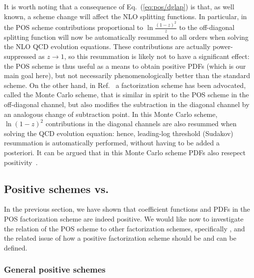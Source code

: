It is worth noting that a consequence of Eq.~(\ref{eq:pos/dglap}) is that,
as well known, a scheme change will affect the NLO splitting
functions. In particular, in the POS scheme contributions proportional
to $\ln\frac{(1-z)^2}{z}$ to the off-diagonal splitting function will
now be automatically resummed to all orders when solving the NLO QCD
evolution equations. These contributions are actually power-suppressed
as $z\to1$, so this resummation is likely not to have a significant
effect: the POS scheme is thus useful as a means to obtain positive
PDFs (which is our main goal here), but not necessarily
phenomenologically better than the standard \msbar{} scheme. On the
other hand, in Ref.~\cite{Jadach:2016acv} a factorization scheme has
been advocated, called the Monte Carlo scheme, that is similar in
spirit to the POS scheme in the off-diagonal channel, but also
modifies the \msbar{} subtraction in the diagonal channel by an
analogous change of subtraction point. In this Monte Carlo scheme,
$\ln(1-z)^2$ contributions in the diagonal channels are also resummed
when solving the QCD evolution equation: hence, leading-log threshold (Sudakov)
resummation is automatically performed, without having to be added a
posteriori. It can be argued that in this Monte Carlo scheme PDFs also
resepect positivity~\cite{jadprivate}.



\subsection{Positive schemes vs.\ \msbar{}}
\label{sec:gen}

In the previous section, we have shown that coefficient functions and
PDFs in the POS
factorization scheme are indeed positive. We would like now to
investigate the relation of the POS scheme to other factorization
schemes, specifically \msbar{}, and the related issue 
of
how a positive factorization scheme should be and can be defined.

\subsubsection{General positive schemes}
\label{sec:gensch}


